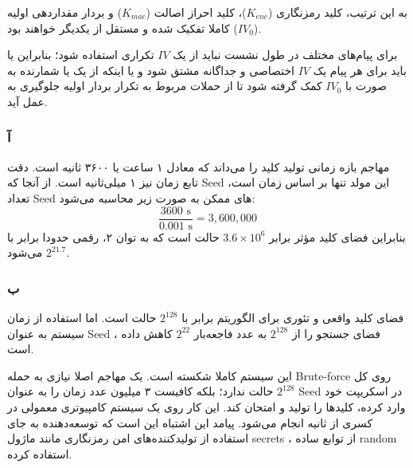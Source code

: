 به این ترتیب، کلید رمزنگاری ($K_{enc}$)، کلید احراز اصالت ($K_{mac}$) و بردار مقداردهی اولیه ($IV_0$) کاملا تفکیک شده و مستقل از یکدیگر خواهند بود. 

برای پیام‌های مختلف در طول نشست نباید از یک $IV$ تکراری استفاده شود؛ بنابراین یا باید برای هر پیام یک $IV$ اختصاصی و جداگانه مشتق شود و یا اینکه از یک  یا شمارنده به صورت  با $IV_0$ کمک گرفته شود تا از حملات مربوط به تکرار بردار اولیه جلوگیری به عمل آید.


\subsubsection*{آ}
مهاجم بازه زمانی تولید کلید را می‌داند که معادل ۱ ساعت یا $۳۶۰۰$ ثانیه است. دقت تابع زمان نیز ۱ میلی‌ثانیه است. از آنجا که Seed این مولد تنها بر اساس زمان است، تعداد Seed های ممکن به صورت زیر محاسبه می‌شود:
$$  \frac{3600 \text{ s}}{0.001 \text{ s}} = 3,600,000 $$
بنابراین فضای کلید مؤثر برابر $3.6 \times 10^6$ حالت است که به توان ۲، رقمی حدودا برابر با $2^{21.7}$ می‌شود.

\subsubsection*{ب}
فضای کلید واقعی و تئوری برای الگوریتم  برابر با $2^{128}$ حالت است. اما استفاده از زمان سیستم به عنوان Seed ، فضای جستجو را از $2^{128}$ به عدد فاجعه‌بار $2^{22}$ کاهش داده است.

این سیستم کاملا شکسته است. یک مهاجم اصلا نیازی به حمله Brute-force روی کل $2^{128}$ حالت ندارد؛ بلکه کافیست ۳ میلیون عدد زمان را به عنوان Seed در اسکریپت خود وارد کرده، کلیدها را تولید و امتحان کند. این کار روی یک سیستم کامپیوتری معمولی در کسری از ثانیه انجام می‌شود. پیامد این اشتباه این است که توسعه‌دهنده به جای استفاده از تولیدکننده‌های امن رمزنگاری مانند ماژول secrets ، از توابع ساده random استفاده کرده.